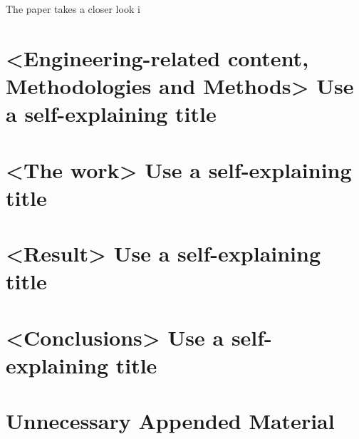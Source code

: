 \documentclass{kththesis}
\begin{document}
The paper \parencite{maia_closer_2016} takes a closer look i


\chapter{<Engineering-related content, Methodologies and Methods> Use a self-explaining title}


\chapter{<The work> Use a self-explaining title}


\chapter{<Result> Use a self-explaining title}


\chapter{<Conclusions> Use a self-explaining title}


\printbibliography[heading=bibintoc] %


\appendix

\chapter{Unnecessary Appended Material}
\end{document}

